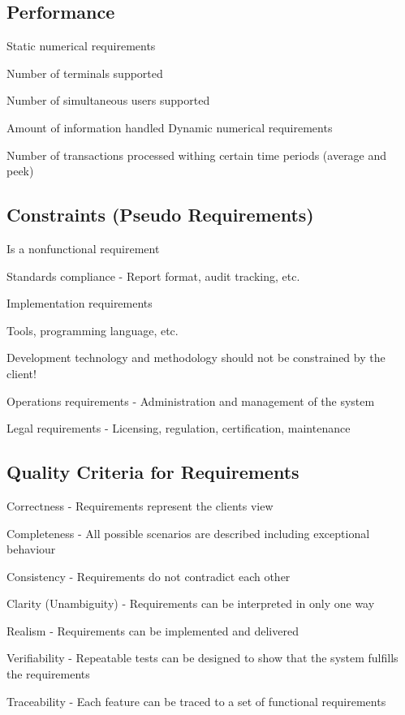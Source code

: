 \subsection{Performance}
Static numerical requirements
\enumstart
	\item Number of terminals supported
	\item Number of simultaneous users supported
	\item Amount of information handled
\enumend
Dynamic numerical requirements
\enumstart
	\item Number of transactions processed withing certain time periods (average and peek)
\enumend

\subsection{Constraints (Pseudo Requirements)}
\enumstart
	\item Is a nonfunctional requirement
	\item Standards compliance - Report format, audit tracking, etc.
	\item Implementation requirements
	\enumstart
		\item Tools, programming language, etc.
		\item Development technology and methodology should not be constrained by the client!
	\enumend
	\item Operations requirements - Administration and management of the system
	\item Legal requirements - Licensing, regulation, certification, maintenance
\enumend

\subsection{Quality Criteria for Requirements}
\enumstart
	\item Correctness - Requirements represent the clients view
	\item Completeness - All possible scenarios are described including exceptional behaviour
	\item Consistency - Requirements do not contradict each other
	\item Clarity (Unambiguity) - Requirements can be interpreted in only one way
	\item Realism - Requirements can be implemented and delivered
	\item Verifiability - Repeatable tests can be designed to show that the system fulfills the requirements
	\item Traceability - Each feature can be traced to a set of functional requirements
\enumend
